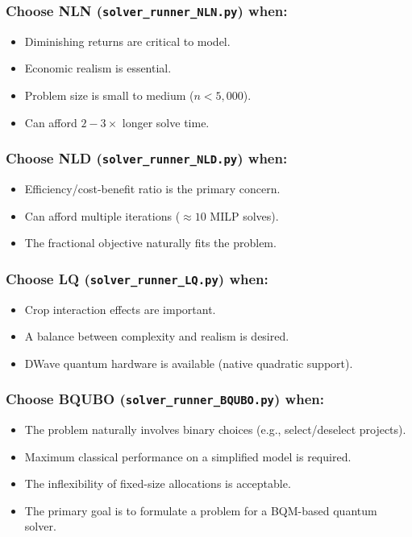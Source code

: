 \documentclass[11pt,a4paper]{article}
\begin{document}
\subsubsection{Choose NLN (\texttt{solver\_runner\_NLN.py}) when:}
\begin{itemize}
    \item Diminishing returns are critical to model.
    \item Economic realism is essential.
    \item Problem size is small to medium ($n < 5,000$).
    \item Can afford $2-3\times$ longer solve time.
\end{itemize}

\subsubsection{Choose NLD (\texttt{solver\_runner\_NLD.py}) when:}
\begin{itemize}
    \item Efficiency/cost-benefit ratio is the primary concern.
    \item Can afford multiple iterations ($\approx 10$ MILP solves).
    \item The fractional objective naturally fits the problem.
\end{itemize}

\subsubsection{Choose LQ (\texttt{solver\_runner\_LQ.py}) when:}
\begin{itemize}
    \item Crop interaction effects are important.
    \item A balance between complexity and realism is desired.
    \item DWave quantum hardware is available (native quadratic support).
\end{itemize}

\subsubsection{Choose BQUBO (\texttt{solver\_runner\_BQUBO.py}) when:}
\begin{itemize}
    \item The problem naturally involves binary choices (e.g., select/deselect projects).
    \item Maximum classical performance on a simplified model is required.
    \item The inflexibility of fixed-size allocations is acceptable.
    \item The primary goal is to formulate a problem for a BQM-based quantum solver.
\end{itemize}
\end{document}
